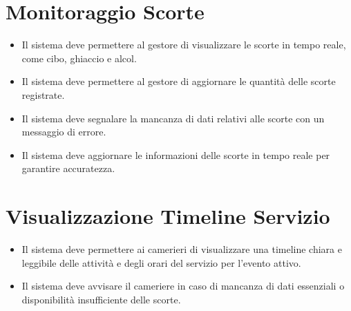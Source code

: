 \documentclass[a4paper,12pt]{article}
\begin{document}
\section*{\textcolor{sectioncolor}{Monitoraggio Scorte}}
\textcolor{textcolor}{
\begin{itemize}
    \item Il sistema deve permettere al gestore di visualizzare le scorte in tempo reale, come cibo, ghiaccio e alcol.
    \item Il sistema deve permettere al gestore di aggiornare le quantità delle scorte registrate.
    \item Il sistema deve segnalare la mancanza di dati relativi alle scorte con un messaggio di errore.
    \item Il sistema deve aggiornare le informazioni delle scorte in tempo reale per garantire accuratezza.
\end{itemize}
}

\section*{\textcolor{sectioncolor}{Visualizzazione Timeline Servizio}}
\textcolor{textcolor}{
\begin{itemize}
    \item Il sistema deve permettere ai camerieri di visualizzare una timeline chiara e leggibile delle attività e degli orari del servizio per l'evento attivo.
    \item Il sistema deve avvisare il cameriere in caso di mancanza di dati essenziali o disponibilità insufficiente delle scorte.
\end{itemize}
}
\end{document}
